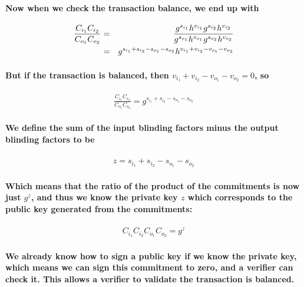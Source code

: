 \documentclass{article}
\begin{document}
\paragraph{Now when we check the transaction balance, we end up with}

\begin{eqnarray}
  \frac{C_{i_1} C_{i_2}}{C_{o_1} C_{o_2}} &=& \frac{g^{s_{i_1}} h^{v_{i_1}} g^{s_{i_2}} h^{v_{i_2}}}{g^{s_{o_1}} h^{v_{o_1}} g^{s_{o_2}} h^{v_{o_2}}}
  \cr &=& g^{s_{i_1} + s_{i_2} - s_{o_1} - s_{o_2}} h^{v_{i_1} + v_{i_2} - v_{o_1} - v_{o_2}}
\end{eqnarray}

\paragraph{But if the transaction is balanced, then $v_{i_1} + v_{i_2} - v_{o_1} - v_{o_2} =0$, so}

\begin{eqnarray}
  \frac{C_{i_1} C_{i_2}}{C_{o_1} C_{o_2}} = g^{s_{i_1} + s_{i_2} - s_{o_1} - s_{o_2}}
\end{eqnarray}

\paragraph{We define the sum of the input blinding factors minus the output blinding factors to be}

\begin{eqnarray}
  z = s_{i_1} + s_{i_2} - s_{o_1} - s_{o_2}
\end{eqnarray}

\paragraph{Which means that the ratio of the product of the commitments is now just $g^z$, and thus we know the private key $z$ which corresponds to the public key generated from the commitments:}

\begin{eqnarray}
  C_{i_1} C_{i_2} C_{o_1} C_{o_2} = g^z
\end{eqnarray}

\paragraph{We already know how to sign a public key if we know the private key, which means we can sign this commitment to zero, and a verifier can check it.  This allows a verifier to validate the transaction is balanced.}
\end{document}
